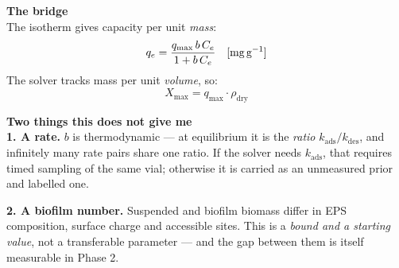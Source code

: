 \documentclass[landscape,12pt]{article}
\begin{document}
\vspace{1mm}
\begin{minipage}[t]{0.45\linewidth}
{\large\bfseries\color{solver} The bridge}\\[3pt]
The isotherm gives capacity per unit \emph{mass}:
\[ q_e = \frac{q_{\max}\,b\,C_e}{1+b\,C_e}\quad\text{[mg\,g$^{-1}$]} \]
The solver tracks mass per unit \emph{volume}, so:
\[ \boxed{\,X_{\max} = q_{\max}\cdot\rho_{\mathrm{dry}}\,} \]

\vspace{2mm}
{\large\bfseries\color{prior} Two things this does not give me}\\[3pt]
\textbf{1. A rate.} $b$ is thermodynamic --- at equilibrium it is the \emph{ratio}
$k_{\mathrm{ads}}/k_{\mathrm{des}}$, and infinitely many rate pairs share one ratio. If the
solver needs $k_{\mathrm{ads}}$, that requires timed sampling of the same vial; otherwise it
is carried as an unmeasured prior and labelled one.

\vspace{2mm}
\textbf{2. A biofilm number.} Suspended and biofilm biomass differ in EPS composition, surface
charge and accessible sites. This is a \emph{bound and a starting value}, not a transferable
parameter --- and the gap between them is itself measurable in Phase 2.
\end{minipage}\hfill
\end{document}
